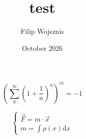 \documentclass{beamer}
\title{test}
\author{Filip Wojsznis}
\date{October 2026}
\begin{document}
\begin{frame}



$$  \left( \sum\limits_0^\infty \left(1+\frac{1}{n} \right)^n \right)^{i\pi}=-1 $$

\end{frame}
$$ \begin{cases}   \vec{F} = m \cdot\ddot{\vec{x}}\\m=\int\rho(x) \text{d} x
\end{cases} $$

\end{document}

